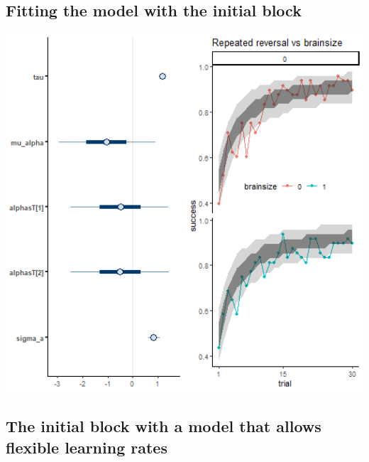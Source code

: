 \documentclass[
]{article}
\begin{document}
\hypertarget{fitting-the-model-with-the-initial-block}{%
\subsection{Fitting the model with the initial
block}\label{fitting-the-model-with-the-initial-block}}

\begin{flushleft}\includegraphics[width=6.67in,]{images/Boussard_short_0_alpha} \end{flushleft}

\hypertarget{the-initial-block-with-a-model-that-allows-flexible-learning-rates}{%
\subsection{The initial block with a model that allows flexible learning
rates}\label{the-initial-block-with-a-model-that-allows-flexible-learning-rates}}
\end{document}
